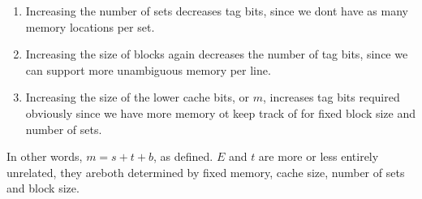 \documentclass{article}
\begin{document}
\begin{enumerate}

\item Increasing the number of sets decreases tag bits, since we dont have as many memory locations per set. 

\item Increasing the size of blocks again decreases the number of tag bits, since we can support more unambiguous memory per line. 

\item Increasing the size of the lower cache bits, or  $m$, increases tag bits required obviously since we have more memory ot keep track of for fixed block size and number of sets. 

\end{enumerate}

In other words, $m = s + t + b$, as defined. $E$ and $t$ are more or less entirely unrelated, they areboth determined by fixed memory, cache size, number of sets and block size. 
\end{document}
